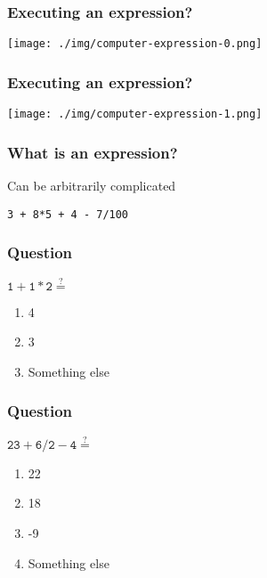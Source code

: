 \documentclass[11pt]{beamer}
\begin{document}
\begin{frame}
  \frametitle{Executing an expression?}
  \texttt{[image: ./img/computer-expression-0.png]}
\end{frame}

\begin{frame}
  \frametitle{Executing an expression?}
  \texttt{[image: ./img/computer-expression-1.png]}
\end{frame}

\begin{frame}
  \frametitle{What is an \textbf{expression}?}
  \Enlarge

  \begin{itemize}
  \myitem  Can be arbitrarily complicated
    \begin{itemize}
    \mysubitem  \texttt{3 + 8*5 + 4 - 7/100}
    \end{itemize}
  \end{itemize}
\end{frame}

\begin{frame}
  \frametitle{Question}
  \Enlarge

  $\mathtt{1 + 1 * 2} \overset{?}{=}$
  \begin{enumerate}[label=\Alph*]
  \item  4
  \item  3
  \item  Something else
  \end{enumerate}
\end{frame}

\begin{frame}
  \frametitle{Question}
  \Enlarge

  $\mathtt{23 + 6 / 2 - 4} \overset{?}{=}$
  \begin{enumerate}[label=\Alph*]
  \item  22
  \item  18
  \item  -9
  \item  Something else
  \end{enumerate}
\end{frame}
\end{document}
